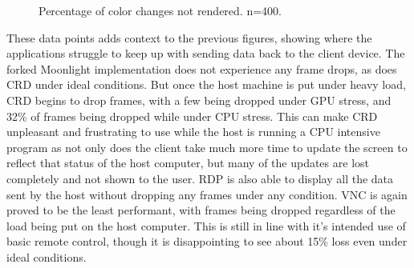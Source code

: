 \begin{figure}[h]
  \centering
  \caption[Color Delay Loss Data]{Percentage of color changes not rendered. n=400.}
  \label{fig:ColorDelayLoss}
\end{figure}

These data points adds context to the previous figures, showing where the applications struggle to keep up with sending data back to the client device.
The forked Moonlight implementation does not experience any frame drops, as does CRD under ideal conditions.
But once the host machine is put under heavy load, CRD begins to drop frames, with a few being dropped under GPU stress, and 32\% of frames being dropped while under CPU stress.
This can make CRD unpleasant and frustrating to use while the host is running a CPU intensive program as not only does the client take much more time to update the screen to reflect that status of the host computer, but many of the updates are lost completely and not shown to the user.
RDP is also able to display all the data sent by the host without dropping any frames under any condition.
VNC is again proved to be the least performant, with frames being dropped regardless of the load being put on the host computer.
This is still in line with it's intended use of basic remote control, though it is disappointing to see about 15\% loss even under ideal conditions.


